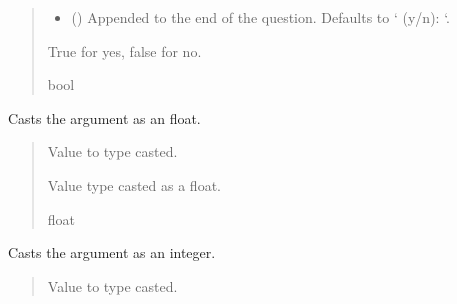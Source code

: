 \documentclass[letterpaper,10pt,english]{sphinxmanual}
\begin{document}
\begin{fulllineitems}
\begin{fulllineitems}
\begin{quote}
\begin{description}
\begin{itemize}
\item {} 
\sphinxAtStartPar
{} (\sphinxstyleliteralemphasis{\sphinxupquote{, }}) \textendash{} Appended to the end of the question. Defaults to ‘ (y/n): ‘.

\end{itemize}

\sphinxAtStartPar
True for yes, false for no.

\sphinxAtStartPar
bool

\end{description}\end{quote}

\end{fulllineitems}


\begin{fulllineitems}
\label{\detokenize{Setup.Inputs:Setup.Inputs.GetUserInput.UserInput.CastFloat}}
\pysigstartsignatures
{}
\pysigstopsignatures
\sphinxAtStartPar
Casts the argument as an float.
\begin{quote}\begin{description}
\sphinxAtStartPar
{} \textendash{} Value to type casted.

\sphinxAtStartPar
Value type casted as a float.

\sphinxAtStartPar
float

\end{description}\end{quote}

\end{fulllineitems}


\begin{fulllineitems}
\label{\detokenize{Setup.Inputs:Setup.Inputs.GetUserInput.UserInput.CastInt}}
\pysigstartsignatures
{}
\pysigstopsignatures
\sphinxAtStartPar
Casts the argument as an integer.
\begin{quote}\begin{description}
\sphinxAtStartPar
{} \textendash{} Value to type casted.


\end{description}
\end{quote}
\end{fulllineitems}
\end{fulllineitems}
\end{document}
